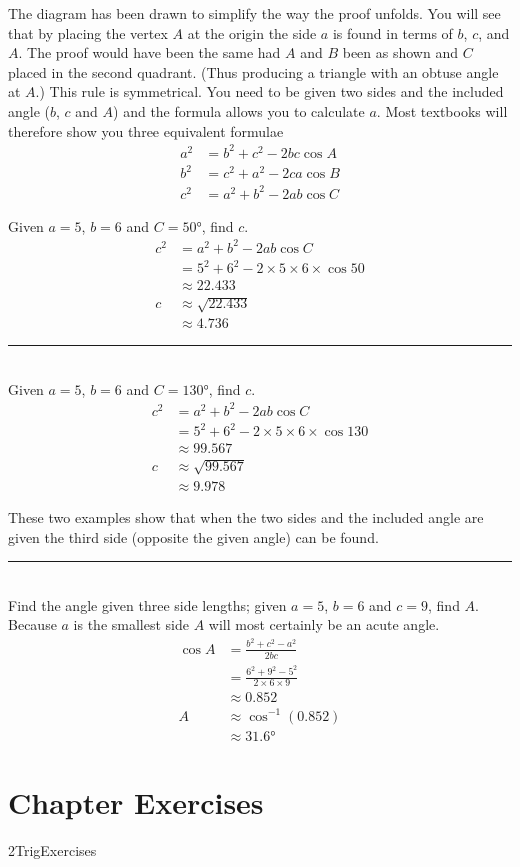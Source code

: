 The diagram has been drawn to simplify the way the proof unfolds. You will see that by placing the vertex $A$ at the origin the side $a$ is found in terms of $b$, $c$, and $A$. The proof would have been the same had $A$ and $B$ been as shown and $C$ placed in the second quadrant. (Thus producing a triangle with an obtuse angle at $A$.) This rule is symmetrical. You need to be given two sides and the included angle ($b$, $c$ and $A$) and the formula allows you to calculate $a$. Most textbooks will therefore show you three equivalent formulae
\begin{align*}a^{2} &  = b^{2} +c^{2} -2 b c \cos  A \\
b^{2} &  = c^{2} +a^{2} -2 c a \cos  B \\
c^{2} &  = a^{2} +b^{2} -2 a b \cos  C\end{align*}

\example Given $a =5$, $b =6$ and $C =\ang{50} $, find $c$.\medskip\\
\solution
\begin{align*}c^{2} &  = a^{2} +b^{2} -2 a b \cos  C \\
&  = 5^{2} +6^{2} -2 \times 5 \times 6 \times \cos  50  \\
&  \approx   22.433 \\
c &  \approx   \sqrt{22.433} \\
&  \approx   4.736 \end{align*}
\rule{6.8cm}{0.5pt}\\
\example Given $a =5$, $b =6$ and $C =\ang{130} $, find $c$.\medskip\\
\solution
\begin{align*}c^{2} &  = a^{2} +b^{2} -2 a b \cos  C \\
&  = 5^{2} +6^{2} -2 \times 5 \times 6 \times \cos  130  \\
&  \approx   99.567 \\
c &  \approx   \sqrt{99.567} \\
&  \approx   9.978\end{align*}

These two examples show that when the two sides and the included angle are given the third side
(opposite the given angle) can be found. \\
\rule{6.8cm}{0.5pt}\\
\example Find the angle given three side lengths; given $a =5$, $b =6$ and $c =9$, find $A$. \medskip\\
\solution Because $a$ is the smallest side $A$ will most certainly be an acute angle.
\begin{align*}\cos  A &  = \frac{b^{2} +c^{2} -a^{2}}{2 b c} \\
&  = \frac{6^{2} +9^{2} -5^{2}}{2 \times 6 \times 9} \\
&  \approx 0.852 \\
A &  \approx \cos ^{ -1} \left (0.852\right ) \\
&  \approx \ang{31.6} 
\end{align*}

\clearpage\section{Chapter Exercises}
{2TrigExercises}

